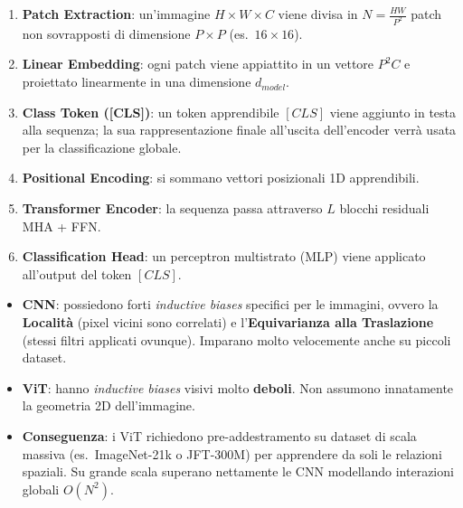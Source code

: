 \documentclass[12pt, a4paper]{report}
\begin{document}
\begin{defbox}
\begin{enumerate}
  \item \textbf{Patch Extraction}: un'immagine $H \times W \times C$ viene divisa in
        $N = \frac{HW}{P^2}$ patch non sovrapposti di dimensione $P \times P$ (es.\ $16 \times 16$).
  \item \textbf{Linear Embedding}: ogni patch viene appiattito in un vettore $P^2 C$ e
        proiettato linearmente in una dimensione $d_{model}$.
  \item \textbf{Class Token ([CLS])}: un token apprendibile $[CLS]$ viene aggiunto in
        testa alla sequenza; la sua rappresentazione finale all'uscita dell'encoder
        verrà usata per la classificazione globale.
  \item \textbf{Positional Encoding}: si sommano vettori posizionali 1D apprendibili.
  \item \textbf{Transformer Encoder}: la sequenza passa attraverso $L$ blocchi
        residuali MHA + FFN.
  \item \textbf{Classification Head}: un perceptron multistrato (MLP) viene applicato
        all'output del token $[CLS]$.
\end{enumerate}
\end{defbox}

\begin{warnbox}
\begin{itemize}
  \item \textbf{CNN}: possiedono forti \emph{inductive biases} specifici per le immagini,
        ovvero la \textbf{Località} (pixel vicini sono correlati) e l'\textbf{Equivarianza alla Traslazione}
        (stessi filtri applicati ovunque). Imparano molto velocemente anche su piccoli dataset.
  \item \textbf{ViT}: hanno \emph{inductive biases} visivi molto \textbf{deboli}. Non assumono
        innatamente la geometria 2D dell'immagine.
  \item \textbf{Conseguenza}: i ViT richiedono pre-addestramento su dataset di scala
        massiva (es.\ ImageNet-21k o JFT-300M) per apprendere da soli le relazioni spaziali.
        Su grande scala superano nettamente le CNN modellando interazioni globali $O(N^2)$.
\end{itemize}
\end{warnbox}

\end{document}
